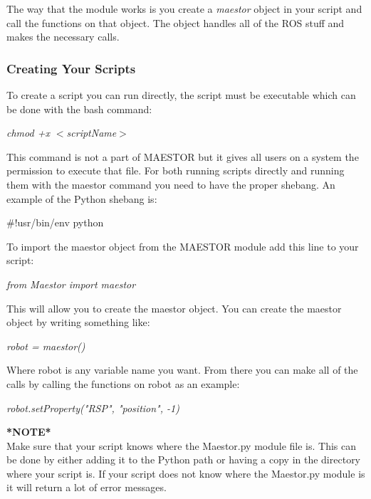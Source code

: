 \documentclass[12pt]{article}
\begin{document}
\noindent The way that the module works is you create a \textit{maestor} object in your script and call the functions on that object. The object handles all of the ROS stuff and makes the necessary calls. 

\subsubsection{Creating Your Scripts}

To create a script you can run directly, the script must be executable which can be done with the bash command:

\begin{center}
	\textit{chmod +x $<$scriptName$>$}
\end{center}

This command is not a part of MAESTOR but it gives all users on a system the permission to execute that file. For both running scripts directly and running them with the maestor command you need to have the proper shebang. An example of the Python shebang is:

\begin{center}
	\#!usr/bin/env python
\end{center} 

To import the maestor object from the MAESTOR module add this line to your script:

\begin{center}
	\textit{from Maestor import maestor}
\end{center}

This will allow you to create the maestor object. You can create the maestor object by writing something like: 

\begin{center}
	\textit{robot = maestor()}
\end{center}

Where robot is any variable name you want. From there you can make all of the calls by calling the functions on robot as an example:

\begin{center}
	\textit{robot.setProperty("RSP", "position", -1)}
\end{center}

\noindent \textbf{*NOTE*}\\
\noindent Make sure that your script knows where the Maestor.py module file is. This can be done by either adding it to the Python path or having a copy in the directory where your script is. If your script does not know where the Maestor.py module is it will return a lot of error messages.  
\end{document}
